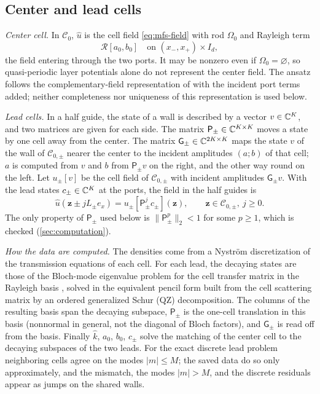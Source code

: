 \subsection{Center and lead cells}\label{sec:center}
\emph{Center cell.} In $\mathcal C_0$, $\widehat u$ is the cell field
\eqref{eq:mfs-field} with rod $\Omega_0$ and Rayleigh term
\begin{equation}\label{eq:hom}
  \mathcal R[a_0,b_0]\quad\text{on }(x_-,x_+)\times I_d,
\end{equation}
the field entering through the two ports. It may be nonzero even if
$\Omega_0=\varnothing$, so quasi-periodic layer potentials alone do not
represent the center field. The ansatz follows the complementary-field
representation of \cite[App.~A]{BarnettGreengard2010} with the incident port
terms added; neither completeness nor uniqueness of this representation is used
below.

\emph{Lead cells.} In a half guide, the state of a wall is described by a vector
$v\in\mathbb{C}^K$, and two matrices are given for each side. The matrix
$\mathsf P_\pm\in\mathbb{C}^{K\times K}$ moves a state by one cell away from the center.
The matrix $\mathsf G_\pm\in\mathbb{C}^{2K\times K}$ maps the state $v$ of the wall of
$\mathcal C_{0,\pm}$ nearer the center to the incident amplitudes $(a;b)$ of that
cell; $a$ is computed from $v$ and $b$ from $\mathsf P_\pm v$ on the right, and the
other way round on the left. Let $u_\pm[v]$ be the cell field of $\mathcal C_{0,\pm}$
with incident amplitudes $\mathsf G_\pm v$. With the lead states $c_\pm\in\mathbb{C}^K$
at the ports, the field in the half guides is
\begin{equation}\label{eq:lead-field}
  \widehat u(\mathbf z\pm jL_\pm e_x)=u_\pm[\mathsf P_\pm^jc_\pm](\mathbf z),
  \qquad\mathbf z\in\mathcal C_{0,\pm},\ j\ge0 .
\end{equation}
The only property of $\mathsf P_\pm$ used below is $\|\mathsf P_\pm^p\|_2<1$ for some
$p\ge1$, which is checked (\cref{sec:computation}).

\emph{How the data are computed.} The densities come from a Nystr\"om
discretization of the transmission equations of each cell. For each lead, the
decaying states are those of the Bloch-mode eigenvalue problem for the cell
transfer matrix in the Rayleigh basis \cite[eq.~(7)]{BottenEtAl2004}, solved in
the equivalent pencil form built from the cell scattering matrix by an ordered
generalized Schur (QZ) decomposition. The columns of the resulting basis span
the decaying subspace, $\mathsf P_\pm$ is the one-cell translation in this basis
(nonnormal in general, not the diagonal of Bloch factors), and $\mathsf G_\pm$ is
read off from the basis. Finally $\widehat k$, $a_0$, $b_0$, $c_\pm$ solve the
matching of the center cell to the decaying subspaces of the two leads. For the
exact discrete lead problem neighboring cells agree on the modes $|m|\le M$; the
saved data do so only approximately, and the mismatch, the modes $|m|>M$, and
the discrete residuals appear as jumps on the shared walls.

